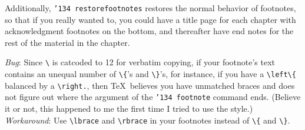 \documentclass{article}
\newcommand{\cs}[1]{\mbox{\tt\bs#1}}%
\newcommand{\bs}{\char '134 }   %
\begin{document}
Additionally, \cs{restorefootnotes} restores the
normal behavior of footnotes, so that if you really
wanted to, you could have a title page for each
chapter with acknowledgment footnotes on the bottom,
and thereafter have end notes for the rest of the
material in the chapter.


{\em Bug}: Since \verb#\# is catcoded to 12 for
verbatim copying, if your footnote's text contains
an unequal number of \verb#\{#'s and \verb#\}#'s,
for instance, if you have a \verb#\left\{#  balanced
by a \verb#\right.#, then \TeX\ believes you have
unmatched braces and does not figure out where the
argument of the \cs{footnote} command ends.  (Believe
it or not, this happened to me the first time I
tried to use the style.)
{\em Workaround}: Use \verb#\lbrace# and \verb#\rbrace#
in your footnotes instead of \verb#\{# and \verb#\}#.
\end{document}
